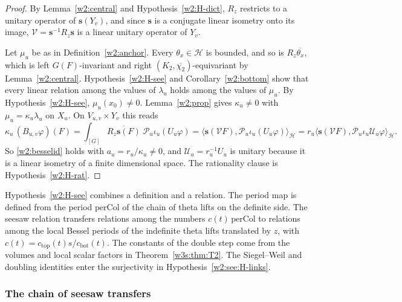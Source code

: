 \begin{proof}
By Lemma~\ref{w2:central} and Hypothesis~\ref{w2:H-dict}, $R_z$ restricts to a unitary operator of $\mathbf s(Y_v)$, and since $\mathbf s$ is a conjugate linear isometry onto its image, $\mathcal V=\mathbf s^{-1}R_z\mathbf s$ is a linear unitary operator of $Y_v$.

Let $\mu_u$ be as in Definition~\ref{w2:anchor}. Every $\theta_x\in\mathcal H$ is bounded, and so is $R_z\overline{\theta_x}$, which is left $G(F)$-invariant and right $(K_2,\overline{\chi_2})$-equivariant by Lemma~\ref{w2:central}. Hypothesis~\ref{w2:H-see} and Corollary~\ref{w2:bottom} show that every linear relation among the values of $\lambda_u$ holds among the values of $\mu_u$. By Hypothesis~\ref{w2:H-see}, $\mu_u(x_0)\ne0$. Lemma~\ref{w2:prop} gives $\kappa_u\ne0$ with $\mu_u=\kappa_u\lambda_u$ on $X_u$. On $V_{u,v}\times Y_v$ this reads
\[
\kappa_u\,(B_{u,v}\varphi)(F)=\int_{[G]}\overline{R_z\mathbf s(F)}\;\mathcal P_u\iota_u(U_u\varphi)=\bigl\langle\mathbf s(\mathcal VF),\mathcal P_u\iota_u(U_u\varphi)\bigr\rangle_{\mathcal H}=r_u\bigl\langle\mathbf s(\mathcal VF),\mathcal P_u\iota_u\mathcal U_u\varphi\bigr\rangle_{\mathcal H}.
\]
So \eqref{w2:besselid} holds with $a_u=r_u/\kappa_u\ne0$, and $\mathcal U_u=r_u^{-1}U_u$ is unitary because it is a linear isometry of a finite dimensional space. The rationality clause is Hypothesis~\ref{w2:H-rat}.
\end{proof}

\begin{remark}\label{w2:rem:Bopen}
Hypothesis~\ref{w2:H-see} combines a definition and a relation. The period map is defined from the period $\mathrm{perCol}$ of the chain of theta lifts on the definite side. The seesaw relation transfers relations among the numbers $c(t)\,\mathrm{perCol}$ to relations among the local Bessel periods of the indefinite theta lifts translated by $z$, with $c(t)=c_{\mathrm{top}}(t)s/c_{\mathrm{bot}}(t)$. The constants of the double step come from the volumes and local scalar factors in Theorem~\ref{w3s:thm:T2}. The Siegel--Weil and doubling identities enter the surjectivity in Hypothesis~\ref{w2:see:H-links}.
\end{remark}

\subsubsection{The chain of seesaw transfers}\label{w2:sec:seesaw}


